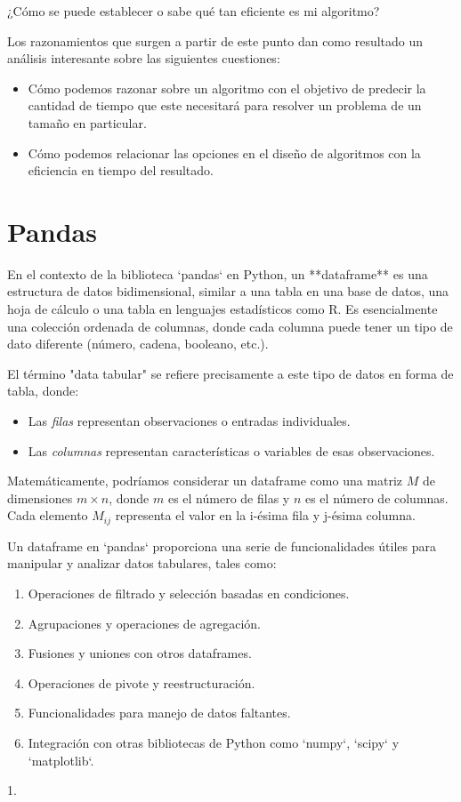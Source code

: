 ¿Cómo se puede establecer o sabe qué tan eficiente es mi algoritmo?

Los razonamientos que surgen a partir de este punto dan como resultado un
análisis interesante sobre las siguientes cuestiones:

\begin{itemize}
    \item Cómo podemos razonar sobre un algoritmo con el objetivo de predecir
          la cantidad de tiempo que este necesitará para resolver un problema de un
          tamaño en particular.
    \item Cómo podemos relacionar las opciones en el diseño de algoritmos con
          la eficiencia en tiempo del resultado.
\end{itemize}

\section{Pandas}

En el contexto de la biblioteca `pandas` en Python, un **dataframe** es una
estructura de datos bidimensional, similar a una tabla en una base de datos,
una hoja de cálculo o una tabla en lenguajes estadísticos como R. Es
esencialmente una colección ordenada de columnas, donde cada columna puede
tener un tipo de dato diferente (número, cadena, booleano, etc.).

El término "data tabular" se refiere precisamente a este tipo de datos en forma
de tabla, donde:

\begin{itemize}
    \item Las \textit{filas} representan observaciones o entradas individuales.
    \item Las \textit{columnas} representan características o variables de esas
          observaciones.
\end{itemize}

Matemáticamente, podríamos considerar un dataframe como una matriz \( M \) de
dimensiones \( m \times n \), donde \( m \) es el número de filas y \( n \) es
el número de columnas. Cada elemento \( M_{ij} \) representa el valor en la
i-ésima fila y j-ésima columna.

Un dataframe en `pandas` proporciona una serie de funcionalidades útiles para
manipular y analizar datos tabulares, tales como:

\begin{enumerate}
    \item Operaciones de filtrado y selección basadas en condiciones.
    \item Agrupaciones y operaciones de agregación.
    \item Fusiones y uniones con otros dataframes.
    \item Operaciones de pivote y reestructuración.
    \item Funcionalidades para manejo de datos faltantes.
    \item  Integración con otras bibliotecas de Python como `numpy`, `scipy` y
          `matplotlib`.
\end{enumerate}1.

